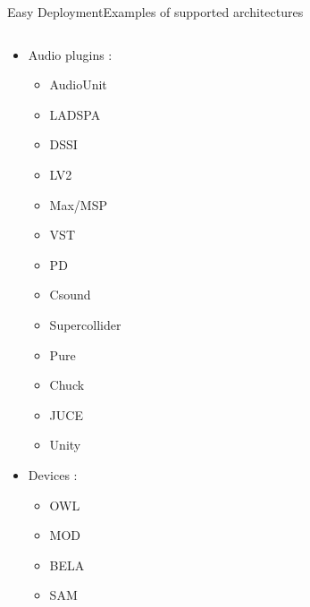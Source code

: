 \begin{frame}[shrink=10]{Easy Deployment}{Examples of supported architectures}
    \begin{columns}[t]
    
    \begin{column}{0.45\textwidth}
        \begin{itemize}
            \item Audio plugins :
            \begin{itemize}
                \item AudioUnit
                \item LADSPA
                \item DSSI
                \item LV2
                \item Max/MSP
                \item VST
                \item PD
                \item Csound
                \item Supercollider
                \item Pure
                \item Chuck
                \item JUCE
                \item Unity
            \end{itemize}
            \item Devices :
            \begin{itemize}
                \item OWL
                \item MOD
                \item BELA
                \item SAM
            \end{itemize}
        \end{itemize}
    \end{column}
    

\end{columns}
\end{frame}
